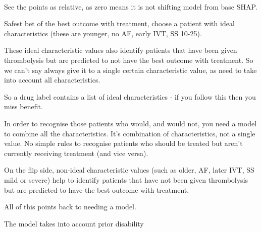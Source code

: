 \begin{figure}
\\
\caption{}
\label{fig:shap_violin_none_benefit_ivt}
\end{figure}

See the points as relative, as zero means it is not shifting model from base SHAP.

Safest bet of the best outcome with treatment, choose a patient with ideal characteristics (these are younger, no AF, early IVT, SS 10-25).

These ideal characteristic values also identify patients that have been given thrombolysis but are predicted to not have the best outcome with treatment. So we can't say always give it to a single certain characteristic value, as need to take into account all characteristics.

So a drug label contains a list of ideal characteristics - if you follow this then you miss benefit. 

In order to recognise those patients who would, and would not, you need a model to combine all the characteristics. It's combination of characteristics, not a single value. No simple rules to recognise patients who should be treated but aren't currently receiving treatment (and vice versa).

On the flip side, non-ideal characteristic values (such as older, AF, later IVT, SS mild or severe) help to identify patients that have not been given thrombolysis but are predicted to have the best outcome with treatment.

All of this points back to needing a model.

The model takes into account prior disability 
\fi